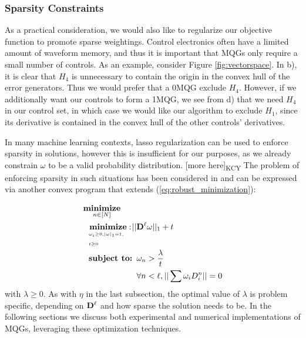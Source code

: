 \documentclass[aps,nofootinbib,pra,notitlepage,twocolumn]{revtex4-1}
\newcommand{\kcy}[1]{{\color{red}[#1]\textsubscript{\rm{KCY}}}}
\begin{document}

\subsubsection{Sparsity Constraints}

As a practical consideration, we would also like to regularize our objective function to promote sparse weightings. Control electronics often have a limited amount of waveform memory, and thus it is important that MQGs only require a small number of controls. As an example, consider Figure \ref{fig:vectorspace}. In b), it is clear that $H_4$ is unnecessary to contain the origin in the convex hull of the error generators. Thus we would prefer that a $0$MQG exclude $H_4$. However, if we additionally want our controls to form a 1MQG, we see from d) that we need $H_4$ in our control set, in which case we would like our algorithm to exclude $H_1$, since its derivative is contained in the convex hull of the other controls' derivatives. 

In many machine learning contexts, lasso regularization \cite{tibshirani1996regression} can be used to enforce sparsity in solutions, however this is insufficient for our purposes, as we already constrain $\omega$ to be a valid probability distribution. \kcy{more here} The problem of enforcing sparsity in such situations has been considered in \cite{NIPS2012_4504} and can be expressed via another convex program that extends (\ref{eq:robust_minimization}):

\begin{equation}\label{eq:minimization_regularization}
\begin{split}
&\underset{n\in[N]}{\textbf{minimize}}\\
&\ \ \bunderbrace{\textbf{minimize}: }{\omega_i\geq0, |\omega|_1=1,\\ t\geq0} ||{\bold{D}^{\ell}}\omega||_1 + t\\
&\ \ \textbf{subject to: } \omega_n > \frac{\lambda}{t}\\
&\ \ \phantom{\textbf{subject to: }} \forall n<\ell, ||\sum \omega_iD_i^n||=0
\end{split}
\end{equation} with $\lambda\geq0$. As with $\eta$ in the last subsection, the optimal value of $\lambda$ is problem specific, depending on $\bold{D}^\ell$ and how sparse the solution needs to be. In the following sections we discuss both experimental and numerical implementations of MQGs, leveraging these optimization techniques. 
\end{document}
